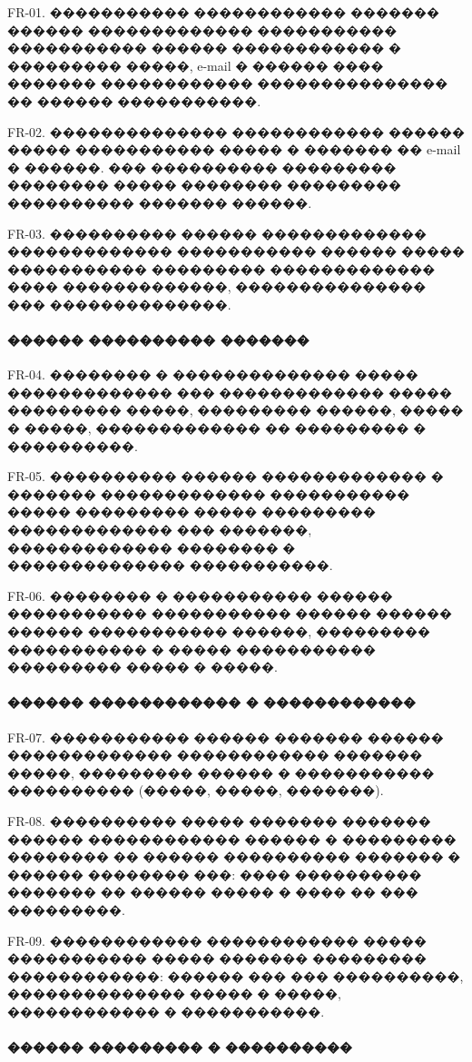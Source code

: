 \documentclass{G7-32}
\begin{document}
FR-01. ����������� ������������  
������� ������ ������������� ����������� ����������� ������ ������������ � ��������� �����, e-mail � ������ ���� ������� ������������ ��������������� �� ������ �����������.

FR-02. ��������������  
������������ ������ ����� ����������� ����� � ������� �� e-mail � ������. ��� ���������� ��������� �������� ����� �������� ��������� ���������� ������� ������.

FR-03. ���������� ������ �������������  
������������� ����������� ������ ����� ����������� ��������� ������������� ���� �������������, ��������������� ��� ��������������.

\paragraph{������ ���������� �������}

FR-04. �������� � �������������� �����  
������������� ��� ������������� ����� ��������� �����, ��������� ������, ����� � �����, ������������� �� ��������� � ����������.

FR-05. ���������� ������ ������������� � �������  
������������� ����������� ����� ��������� ����� ��������� ������������� ��� �������, ������������� �������� � �������������� �����������.

FR-06. �������� � ����������� ������ �����������  
����������� ������ ������ ������ ����������� ������, ��������� ����������� � ����� ����������� ��������� ����� � �����.

\paragraph{������ ������������ � ������������}

FR-07. ����������� ������  
������� ������ ������������� ������������ ������� �����, ��������� ������ � ����������� ���������� (�����, �����, �������).

FR-08. ���������� ����� �������  
������� ������ ������������ ������ � ��������� �������� �� ������ ���������� ������� � ������ �������� ���: ���� ���������� ������� �� ������ ����� � ���� �� ��� ���������.

FR-09. ������������ ������������  
����� ����������� ����� ������� ��������� ������������: ������ ��� ��� ����������, �������������� ����� � �����, ������������ � �����������.

\paragraph{������ ��������� � ����������}
\end{document}
